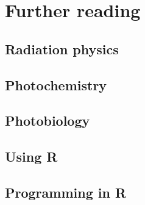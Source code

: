 
\chapter{Further reading}\label{chap:R:readings}

\section{Radiation physics}

\section{Photochemistry}

\section{Photobiology}

\section{Using R}

\section{Programming in R}

